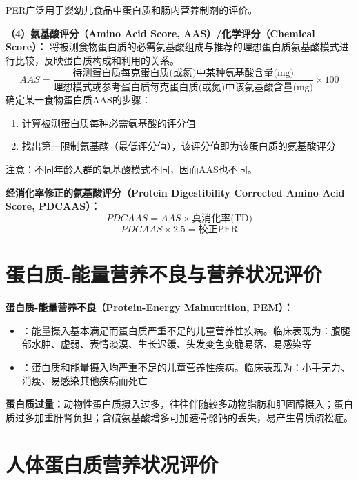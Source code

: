 \begin{keybox}
PER广泛用于婴幼儿食品中蛋白质和肠内营养制剂的评价。 %

\textbf{（4）氨基酸评分（Amino Acid Score, AAS）/化学评分（Chemical Score）\difficulty：}
将被测食物蛋白质的必需氨基酸组成与推荐的理想蛋白质氨基酸模式进行比较，反映蛋白质构成和利用的关系。
\[AAS = \frac{\text{待测蛋白质每克蛋白质(或氮)中某种氨基酸含量(mg)}}{\text{理想模式或参考蛋白质每克蛋白质(或氮)中该氨基酸含量(mg)}} \times 100\]
确定某一食物蛋白质AAS的步骤：
\begin{enumerate}[leftmargin=*]
    \item 计算被测蛋白质每种必需氨基酸的评分值
    \item 找出第一限制氨基酸（最低评分值），该评分值即为该蛋白质的氨基酸评分
\end{enumerate}
注意：不同年龄人群的氨基酸模式不同，因而AAS也不同。

\textbf{经消化率修正的氨基酸评分（Protein Digestibility Corrected Amino Acid Score, PDCAAS）\difficulty：}
\[PDCAAS = AAS \times \text{真消化率(TD)}\]
\[PDCAAS \times 2.5 = \text{校正PER}\]
\end{keybox}

\section{蛋白质-能量营养不良与营养状况评价}

\begin{keybox}
\textbf{蛋白质-能量营养不良（Protein-Energy Malnutrition, PEM）：}
\begin{itemize}[leftmargin=*]
    \item {}：能量摄入基本满足而蛋白质严重不足的儿童营养性疾病。临床表现为：腹腿部水肿、虚弱、表情淡漠、生长迟缓、头发变色变脆易落、易感染等
    \item {}：蛋白质和能量摄入均严重不足的儿童营养性疾病。临床表现为：小手无力、消瘦、易感染其他疾病而死亡
\end{itemize}

\textbf{蛋白质过量：}动物性蛋白质摄入过多，往往伴随较多动物脂肪和胆固醇摄入；蛋白质过多加重肝肾负担；含硫氨基酸增多可加速骨骼钙的丢失，易产生骨质疏松症。 %
\end{keybox}

\section{人体蛋白质营养状况评价}

